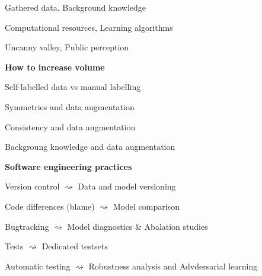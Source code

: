 \documentclass[landscape,footrule]{foils}
\begin{document}
\titlefoil


\begin{triangles}
\item Gathered data,  Background knowledge
\item Computational resources, Learning algorithms
\item Uncanny valley, Public perception
\end{triangles}
\enlargethispage{1cm}



\textbf{How to increase volume}
\begin{triangles}
\item Self-labelled data vs manual labelling
\item Symmetries and data augmentation
\item Consistency and data augmentation
\item Backgroung knowledge and data augmentation
\end{triangles}
\vspace*{3ex}

\textbf{Software engineering practices}
\begin{triangles}
\item Version control $\rightsquigarrow$ Data and model versioning
\item Code differences (blame) $\rightsquigarrow$ Model comparison
\item Bugtracking $\rightsquigarrow$ Model diagnostics \& Abalation studies  
\item Tests $\rightsquigarrow$  Dedicated testsets
\item Automatic testing $\rightsquigarrow$ Robustness analysis and Advdersarial learning
\end{triangles}


\enlargethispage{1cm}
\end{document}
